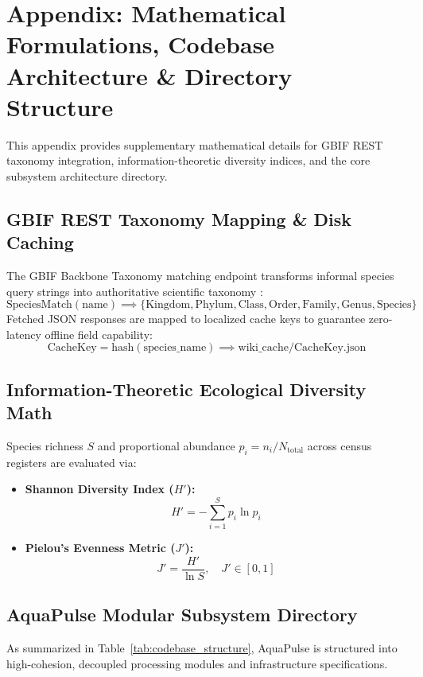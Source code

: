 \documentclass[11pt,a4paper]{article}
\newcommand{\citeblue}[1]{\cite{#1}}
\newcommand{\refblue}[1]{\ref{#1}}
\begin{document}
\newpage
\appendix
\section{Appendix: Mathematical Formulations, Codebase Architecture \& Directory Structure}

This appendix provides supplementary mathematical details for GBIF REST taxonomy integration, information-theoretic diversity indices, and the core subsystem architecture directory.

\subsection{GBIF REST Taxonomy Mapping \& Disk Caching}
\label{sec:app_gbif}
The GBIF Backbone Taxonomy matching endpoint transforms informal species query strings into authoritative scientific taxonomy \citeblue{gbif2026backbone}:
\begin{equation}
\text{SpeciesMatch}(\text{name}) \implies \{\text{Kingdom}, \text{Phylum}, \text{Class}, \text{Order}, \text{Family}, \text{Genus}, \text{Species}\}
\end{equation}
Fetched JSON responses are mapped to localized cache keys to guarantee zero-latency offline field capability:
\begin{equation}
\text{CacheKey} = \text{hash}(\text{species\_name}) \implies \text{wiki\_cache/CacheKey.json}
\end{equation}

\subsection{Information-Theoretic Ecological Diversity Math}
\label{sec:app_diversity}
Species richness $S$ and proportional abundance $p_i = n_i / N_{\text{total}}$ across census registers are evaluated via:
\begin{itemize}
    \item \textbf{Shannon Diversity Index ($H'$):}
    \begin{equation}
    H' = -\sum_{i=1}^S p_i \ln p_i
    \end{equation}
    \item \textbf{Pielou's Evenness Metric ($J'$):}
    \begin{equation}
    J' = \frac{H'}{\ln S}, \quad J' \in [0, 1]
    \end{equation}
\end{itemize}

\subsection{AquaPulse Modular Subsystem Directory}
\label{sec:app_codebase}
As summarized in Table~\refblue{tab:codebase_structure}, AquaPulse is structured into high-cohesion, decoupled processing modules and infrastructure specifications.
\end{document}
